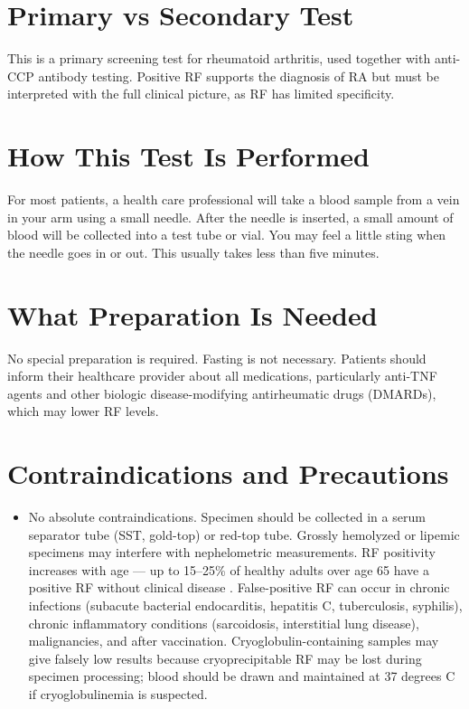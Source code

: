 \section*{Primary vs Secondary Test}
This is a primary screening test for rheumatoid arthritis, used together with anti-CCP antibody testing. Positive RF supports the diagnosis of RA but must be interpreted with the full clinical picture, as RF has limited specificity.

\section*{How This Test Is Performed}
For most patients, a health care professional will take a blood sample from a vein in your arm using a small needle. After the needle is inserted, a small amount of blood will be collected into a test tube or vial. You may feel a little sting when the needle goes in or out. This usually takes less than five minutes.

\section*{What Preparation Is Needed}
No special preparation is required. Fasting is not necessary. Patients should inform their healthcare provider about all medications, particularly anti-TNF agents and other biologic disease-modifying antirheumatic drugs (DMARDs), which may lower RF levels.

\section*{Contraindications and Precautions}
\begin{itemize}
  \item No absolute contraindications. Specimen should be collected in a serum separator tube (SST, gold-top) or red-top tube. Grossly hemolyzed or lipemic specimens may interfere with nephelometric measurements. RF positivity increases with age --- up to 15--25\% of healthy adults over age 65 have a positive RF without clinical disease \cite{ingegnoli2013rheumatoid}. False-positive RF can occur in chronic infections (subacute bacterial endocarditis, hepatitis C, tuberculosis, syphilis), chronic inflammatory conditions (sarcoidosis, interstitial lung disease), malignancies, and after vaccination. Cryoglobulin-containing samples may give falsely low results because cryoprecipitable RF may be lost during specimen processing; blood should be drawn and maintained at 37 degrees C if cryoglobulinemia is suspected.
\end{itemize}
